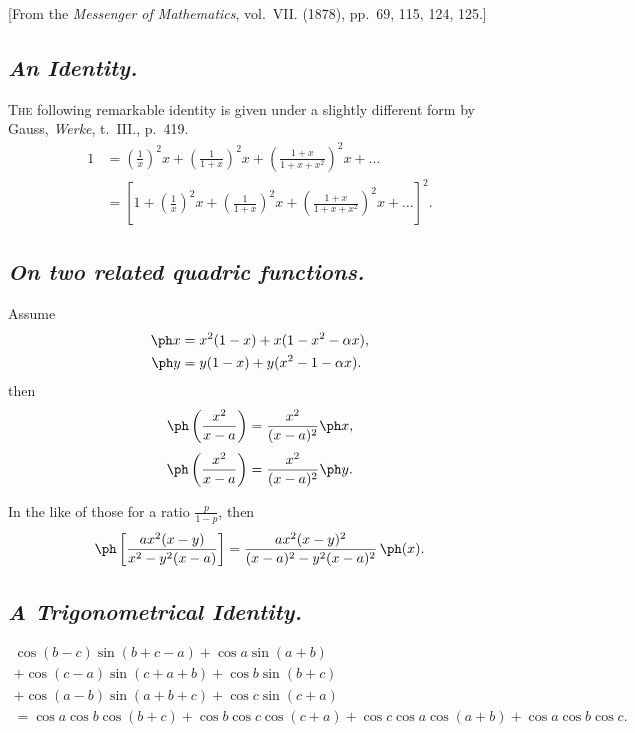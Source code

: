 \documentclass[11pt,a4paper]{book}
\begin{document}
\begin{center}
\small [From the \textit{Messenger of Mathematics}, vol.~VII. (1878), pp.~69, 115, 124, 125.]
\end{center}

\medskip

\subsection*{\textit{An Identity.}}

\textsc{The} following remarkable identity is given under a slightly different form by Gauss, \textit{Werke}, t.~III., p.~419.
\begin{align*}
1&=\left(\frac{1}{x}\right)^2x+\left(\frac{1}{1+x}\right)^2x+\left(\frac{1+x}{1+x+x^2}\right)^2x+\dots\\
&=\left[1+\left(\frac{1}{x}\right)^2x+\left(\frac{1}{1+x}\right)^2x+\left(\frac{1+x}{1+x+x^2}\right)^2x+\dots\right]^2.
\end{align*}

\subsection*{\textit{On two related quadric functions.}}

Assume
\begin{align*}
\ph x&=x^2(1-x)+x(1-x^2-\alpha x),\\
\ph y&=y(1-x)+y(x^2-1-\alpha x).
\end{align*}
then
\[
\ph\left(\frac{x^2}{x-a}\right)=\frac{x^2}{(x-a)^2}\ph x,
\]
\[
\ph\left(\frac{x^2}{x-a}\right)=\frac{x^2}{(x-a)^2}\ph y.
\]

In the like of those for a ratio $\frac{p}{1-p}$, then
\[
\ph\left[\frac{ax^2(x-y)}{x^2-y^2(x-a)}\right]=\frac{ax^2(x-y)^2}{(x-a)^2-y^2(x-a)^2}\,\ph(x).
\]

\newpage
\subsection*{\textit{A Trigonometrical Identity.}}

\begin{align*}
\cos(b-c)\sin(b+c-a)+\cos a\sin(a+b)\\
+\cos(c-a)\sin(c+a+b)+\cos b\sin(b+c)\\
+\cos(a-b)\sin(a+b+c)+\cos c\sin(c+a)\\
=\cos a\cos b\cos(b+c)+\cos b\cos c\cos(c+a)+\cos c\cos a\cos(a+b)+\cos a\cos b\cos c.
\end{align*}
\end{document}
